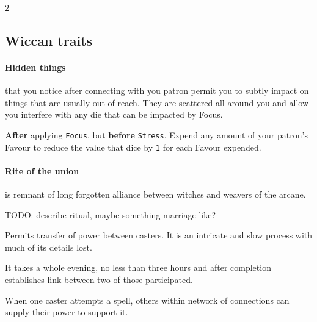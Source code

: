 \begin{multicols*}{2}

\subsection*{Wiccan traits}

\paragraph{Hidden things} that you notice after connecting with you patron permit you to subtly impact on things that are usually out of reach. 
They are scattered all around you and allow you interfere with any die that can be impacted by Focus. 

\textbf{After} applying \texttt{Focus}, but \textbf{before} \texttt{Stress}. 
Expend any amount of your patron's Favour to reduce the value that dice by \texttt{1} for each Favour expended.

\paragraph{Rite of the union} is remnant of long forgotten alliance between witches and weavers of the arcane.

TODO: describe ritual, maybe something marriage-like?

Permits transfer of power between casters. 
It is an intricate and slow process with much of its details lost. 

It takes a whole evening, no less than three hours and after completion establishes link between two of those participated. 

When one caster attempts a spell, others within network of connections can supply their power to support it. 



\end{multicols*}
